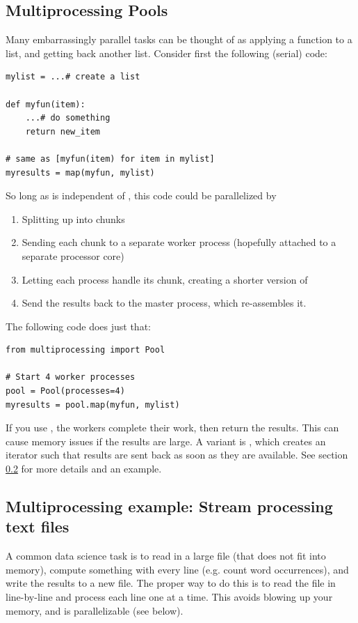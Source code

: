 \subsection{Multiprocessing Pools}
Many embarrassingly parallel tasks can be thought of as applying a function to a list, and getting back another list.  Consider first the following (serial) code:
\begin{verbatim}
mylist = ...# create a list

def myfun(item):
    ...# do something
    return new_item

# same as [myfun(item) for item in mylist]
myresults = map(myfun, mylist)
\end{verbatim}
So long as  is independent of , this code could be parallelized by 
\begin{enumerate}
  \item Splitting  up into chunks
  \item Sending each chunk to a separate worker process (hopefully attached to a separate processor core)
  \item Letting each process handle its chunk, creating a shorter version of 
  \item Send the results back to the master process, which re-assembles it.
\end{enumerate}
The following code does just that:
\begin{verbatim}
from multiprocessing import Pool

# Start 4 worker processes
pool = Pool(processes=4)
myresults = pool.map(myfun, mylist)
\end{verbatim}

If you use , the workers complete their work, then return the results.  This can cause memory issues if the results are large.  A variant is , which creates an iterator such that results are sent back as soon as they are available.  See section \ref{performance:subsection:stream-processing-text} for more details and an example.

\subsection{Multiprocessing example:  Stream processing text files}
\label{performance:subsection:stream-processing-text}

A common data science task is to read in a large file (that does not fit into memory), compute something with every line (e.g. count word occurrences), and write the results to a new file.  The proper way to do this is to read the file in  line-by-line and process each line one at a time.  This avoids blowing up your memory, and is parallelizable (see below).  

